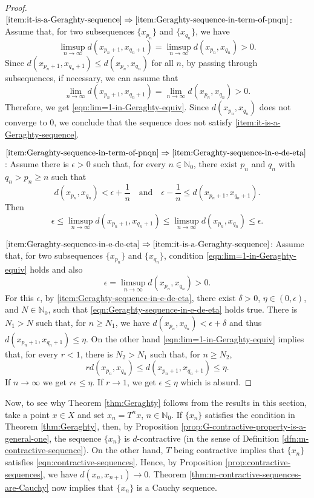 \documentclass[a4paper,10pt,twoside,reqno]{amsart}
\theoremstyle{definition}
\theoremstyle{remark}
\newcommand{\set}[1]{\{#1\}}
\newcommand{\de}{\delta}
\newcommand{\e}{\epsilon}
\newcommand{\N}{\mathbb{N}}
\numberwithin{equation}{section}
\begin{document}
\begin{proof}
  $\eqref{item:it-is-a-Geraghty-sequence}
  \Rightarrow \eqref{item:Geraghty-sequence-in-term-of-pnqn}$:
  Assume that, for two subsequences $\{x_{p_n}\}$ and $\{x_{q_n}\}$, we have
  \[
    \limsup_{n\to\infty} d(x_{p_n+1},x_{q_n+1})
    =\limsup_{n\to\infty} d(x_{p_n},x_{q_n})>0.
  \]
  Since $d(x_{p_n+1},x_{q_n+1})\leq d(x_{p_n},x_{q_n})$ for all $n$,
  by passing through subsequences, if necessary, we can assume that
  \[
    \lim_{n\to\infty} d(x_{p_n+1},x_{q_n+1})
    =\lim_{n\to\infty} d(x_{p_n},x_{q_n})>0.
  \]
  Therefore, we get \eqref{eqn:lim=1-in-Geraghty-equiv}. Since
  $d(x_{p_n},x_{q_n})$ does not converge to $0$, we conclude that the sequence
  does not satisfy \eqref{item:it-is-a-Geraghty-sequence}.

  $\eqref{item:Geraghty-sequence-in-term-of-pnqn}
  \Rightarrow \eqref{item:Geraghty-sequence-in-e-de-eta}$:
  Assume there is $\e>0$ such that, for every $n\in\N_0$, there exist $p_n$ and $q_n$ with
  $q_n>p_n\geq n$ such that
  \[
    d(x_{p_n},x_{q_n}) < \e + \frac1n
    \quad \text{and} \quad
    \e-\frac1n \leq d(x_{p_n+1},x_{q_n+1}).
  \]
  Then
  \[
    \e \leq \limsup_{n\to\infty} d(x_{p_n+1},x_{q_n+1}) \leq \limsup_{n\to\infty} d(x_{p_n},x_{q_n}) \leq \e.
  \]

  $\eqref{item:Geraghty-sequence-in-e-de-eta}
  \Rightarrow \eqref{item:it-is-a-Geraghty-sequence}$:
  Assume that, for two subsequences $\set{x_{p_n}}$ and $\set{x_{q_n}}$, condition \eqref{eqn:lim=1-in-Geraghty-equiv}
  holds and also
  \[
    \e=\limsup_{n\to\infty} d(x_{p_n},x_{q_n})>0.
  \]
  For this $\e$, by \eqref{item:Geraghty-sequence-in-e-de-eta}, there
  exist $\de>0$, $\eta\in(0,\e)$, and $N\in\N_0$, such that
  \eqref{eqn:Geraghty-sequence-in-e-de-eta} holds true.
  There is $N_1>N$ such that, for $n\geq N_1$, we have $d(x_{p_n},x_{q_n}) < \e + \de$
  and thus $d(x_{p_n+1},x_{q_n+1})\leq \eta$. On the other hand \eqref{eqn:lim=1-in-Geraghty-equiv}
  implies that, for every $r<1$, there is $N_2>N_1$ such that, for $n\geq N_2$,
  \[
    r d(x_{p_n},x_{q_n}) \leq d(x_{p_n+1},x_{q_n+1})\leq \eta.
  \]
  If $n\to\infty$ we get $r\e \leq \eta$. If $r\to 1$, we get $\e \leq \eta$
  which is absurd.
\end{proof}

Now, to see why Theorem \ref{thm:Geraghty} follows from the results in this section,
take a point $x\in X$ and set $x_n=T^nx$, $n\in\N_0$. If $\set{x_n}$ satisfies
the condition in Theorem \ref{thm:Geraghty}, then, by Proposition
\ref{prop:G-contractive-property-is-a-general-one}, the sequence $\set{x_n}$ is
$d$-contractive (in the sense of Definition \ref{dfn:m-contractive-sequence}).
On the other hand, $T$ being contractive implies that $\set{x_n}$ satisfies
\eqref{eqn:contractive-sequences}. Hence, by Proposition \ref{prop:contractive-sequences},
we have $d(x_n,x_{n+1})\to0$. Theorem \ref{thm:m-contractive-sequences-are-Cauchy} now
implies that $\set{x_n}$ is a Cauchy sequence.
\end{document}
